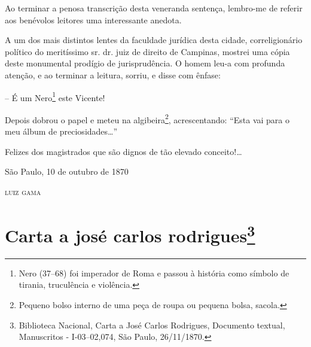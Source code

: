 {Ao terminar a penosa transcrição desta veneranda sentença, lembro-me de
referir aos benévolos leitores uma interessante anedota.

A um dos mais distintos lentes da faculdade jurídica desta cidade,
correligionário político do meritíssimo sr. dr. juiz de direito de
Campinas, mostrei uma cópia deste monumental prodígio de jurisprudência.
O homem leu-a com profunda atenção, e ao terminar a leitura, sorriu, e
disse com ênfase:

-- É um Nero\footnote{ Nero (37--68) foi imperador de Roma e passou à
  história como símbolo de tirania, truculência e violência.} este
Vicente!

Depois dobrou o papel e meteu na algibeira\footnote{ Pequeno bolso
  interno de uma peça de roupa ou pequena bolsa, sacola.},
acrescentando: ``Esta vai para o meu álbum de preciosidades\ldots{}''

Felizes dos magistrados que são dignos de tão elevado conceito!\ldots{}

\begin{flushright}
São Paulo, 10 de outubro de 1870

\textsc{luiz gama}
\end{flushright}

\chapter{Carta a josé carlos rodrigues\footnote{Biblioteca Nacional, Carta a José Carlos Rodrigues,
  Documento textual, Manuscritos - I-03--02,074, São Paulo, 26/11/1870.}} %

}
